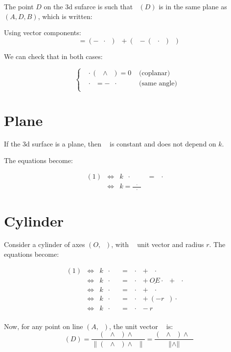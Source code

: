 \documentclass[10pt,a4paper]{article}
\newcommand{\ud}[1]{\underline{#1}}
\DeclareMathOperator{\cross}{\wedge}
\DeclareMathOperator{\AC}{\ud{AC}}
\DeclareMathOperator{\AO}{\ud{AO}}
\DeclareMathOperator{\OD}{\ud{OD}}
\DeclareMathOperator{\ED}{\ud{ED}}
\DeclareMathOperator{\eA}{\ud{e}_A}
\DeclareMathOperator{\eB}{\ud{e}_B}
\DeclareMathOperator{\n}{\ud{n}}
\DeclareMathOperator{\z}{\ud{z}}
\DeclareMathOperator{\ODz}{\|\OD \cross  \z\|}
\begin{document}
The point $D$ on the 3d sufarce is such that $\n(D)$ is in the same plane as
$(A, D, B)$, which is written:

Using vector components:
$$
 \eB = (-\eA\cdot\n) \n + \left( \eA - (\eA \cdot \n)\n \right)
$$

We can check that in both cases:

$$
\left\{
\begin{array}{lll}
    \eB \cdot (\eA \cross \n) = 0 & \text{  (coplanar)}\\
    \eB \cdot \n = -\eA \cdot \n & \text{  (same angle)}\\
\end{array}
\right.
$$


\newpage
\section{Plane}

If the 3d surface is a plane, then $\n$ is constant and does not depend on $k$.

The equations become:

$$
\begin{array}{llll}
    (1)
    & \Leftrightarrow &
    k\eA\cdot\n
    & = \AC\cdot\n\\
    & \Leftrightarrow &
    k = \frac{\AC\cdot\n}{\eA\cdot\n}
\end{array}
$$


\newpage
\section{Cylinder}

Consider a cylinder of axes $(O, \z)$, with $\z$  unit vector and radius $r$.
The equations become:

$$
\begin{array}{llll}
    (1)
    & \Leftrightarrow &
    k\eA\cdot\n
    & = \AO\cdot\n + \OD\cdot \n\\
    & \Leftrightarrow &
    k\eA\cdot\n
    & = \AO\cdot\n + \ud{OE}\cdot \n + \ED \cdot \n\\
    & \Leftrightarrow &
    k\eA\cdot\n
    & = \AO\cdot\n + \ED \cdot \n\\
    & \Leftrightarrow &
    k\eA\cdot\n
    & = \AO\cdot\n + (-r\n) \cdot \n\\
    & \Leftrightarrow &
    k\eA\cdot\n
    & = \AO\cdot\n - r\\
\end{array}
$$

Now, for any point on line $(A, \eA)$, the unit vector $\n$ is:
$$
\n(D) = \frac{(\OD \cross  \z) \cross \z}{
    \|(\OD \cross  \z) \cross \z\|
}
    = \frac{(\OD \cross  \z) \cross \z}{\ODz}
$$
\end{document}
